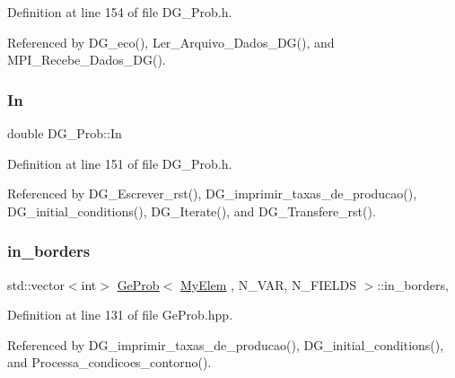 Definition at line 154 of file D\+G\+\_\+\+Prob.\+h.



Referenced by D\+G\+\_\+eco(), Ler\+\_\+\+Arquivo\+\_\+\+Dados\+\_\+\+D\+G(), and M\+P\+I\+\_\+\+Recebe\+\_\+\+Dados\+\_\+\+D\+G().

\mbox{\label{classDG__Prob_aebab98aa14e6b30bc3d8cda2f83b7feb}} 
\subsubsection{\texorpdfstring{In}{In}}
{\footnotesize\ttfamily double D\+G\+\_\+\+Prob\+::\+In\hspace{0.3cm}{\ttfamily [private]}}



Definition at line 151 of file D\+G\+\_\+\+Prob.\+h.



Referenced by D\+G\+\_\+\+Escrever\+\_\+rst(), D\+G\+\_\+imprimir\+\_\+taxas\+\_\+de\+\_\+producao(), D\+G\+\_\+initial\+\_\+conditions(), D\+G\+\_\+\+Iterate(), and D\+G\+\_\+\+Transfere\+\_\+rst().

\mbox{\label{classGeProb_a9615df97c98b9b37d98f8548fad48439}} 
\subsubsection{\texorpdfstring{in\+\_\+borders}{in\_borders}}
{\footnotesize\ttfamily std\+::vector$<$int$>$ \hyperlink{classGeProb}{Ge\+Prob}$<$ \hyperlink{DG__Prob_8h_a83cd887ced9a6587428f267e50cd4787}{My\+Elem} , N\+\_\+\+V\+AR, N\+\_\+\+F\+I\+E\+L\+DS $>$\+::in\+\_\+borders\hspace{0.3cm}{\ttfamily [protected]}, {\ttfamily [inherited]}}



Definition at line 131 of file Ge\+Prob.\+hpp.



Referenced by D\+G\+\_\+imprimir\+\_\+taxas\+\_\+de\+\_\+producao(), D\+G\+\_\+initial\+\_\+conditions(), and Processa\+\_\+condicoes\+\_\+contorno().

\mbox{\label{classDG__Prob_a28e2522980d0880a464b0aaffb30ad83}} 
